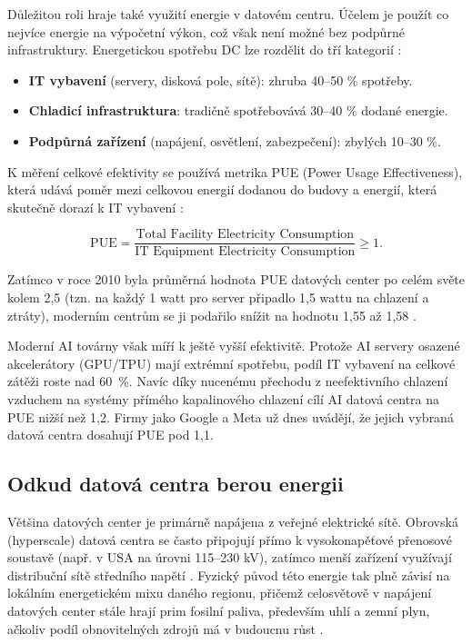 Důležitou roli hraje také využití energie v datovém centru. Účelem je použít co nejvíce energie na výpočetní výkon, což však není možné bez podpůrné infrastruktury. Energetickou spotřebu DC lze rozdělit do tří kategorií \cite{chen_electricity_2025, sheng_power_2026}:

\begin{itemize}
    \item \textbf{IT vybavení} (servery, disková pole, sítě): zhruba 40--50 \% spotřeby.

    \item \textbf{Chladicí infrastruktura}: tradičně spotřebovává 30--40 \% dodané energie.

    \item \textbf{Podpůrná zařízení} (napájení, osvětlení, zabezpečení): zbylých 10--30 \%.
\end{itemize}
 
K měření celkové efektivity se používá metrika PUE (Power Usage Effectiveness), která udává poměr mezi celkovou energií dodanou do budovy a energií, která skutečně dorazí k IT vybavení \cite{chen_electricity_2025}:

$$\text{PUE} = \frac{\text{Total Facility Electricity Consumption}}{\text{IT Equipment Electricity Consumption}} \geq 1.$$

Zatímco v roce 2010 byla průměrná hodnota PUE datových center po celém světe kolem 2,5 (tzn. na každý 1 watt pro server připadlo 1,5 wattu na chlazení a ztráty), moderním centrům se ji podařilo snížit na hodnotu 1,55 až 1,58 \cite{de_roucy-rochegonde_ai_2025}.

Moderní AI továrny však míří k ještě vyšší efektivitě. Protože AI servery osazené akcelerátory (GPU/TPU) mají extrémní spotřebu, podíl IT vybavení na celkové zátěži roste nad 60~\%.  Navíc díky nucenému přechodu z neefektivního chlazení vzduchem na systémy přímého kapalinového chlazení cílí AI datová centra na PUE nižší než 1,2. Firmy jako Google a Meta už dnes uvádějí, že jejich vybraná datová centra dosahují PUE pod 1,1. \cite{chen_electricity_2025, sheng_power_2026}

\subsection{Odkud datová centra berou energii}

Většina datových center je primárně napájena z veřejné elektrické sítě. Obrovská (hyperscale) datová centra se často připojují přímo k vysokonapěťové přenosové soustavě (např. v USA na úrovni 115–230 kV), zatímco menší zařízení využívají distribuční sítě středního napětí \cite[s. 4]{chen_electricity_2025}. Fyzický původ této energie tak plně závisí na lokálním energetickém mixu daného regionu, přičemž celosvětově v napájení datových center stále hrají prim fosilní paliva, především uhlí a zemní plyn, ačkoliv podíl obnovitelných zdrojů má v budoucnu růst \cite[s. 86]{iea_energy_2025}.

